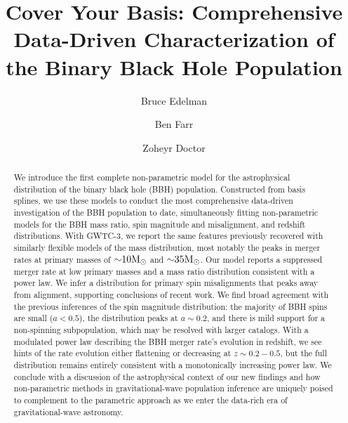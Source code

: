 \documentclass[twocolumn]{aastex631}
\newcommand{\msun}{\ensuremath{{\rm M}_\odot}}
\begin{document}
\title{Cover Your Basis: Comprehensive Data-Driven Characterization of the Binary Black Hole Population}

\author{Bruce Edelman}
\author{Ben Farr}
\author{Zoheyr Doctor}


\begin{abstract}                 
We introduce the first complete non-parametric model for the astrophysical distribution of the binary black hole (BBH) population. Constructed from basis splines, we use these models to conduct the most comprehensive data-driven investigation of the BBH population to date, simultaneously fitting non-parametric models for the BBH mass ratio, spin magnitude and misalignment, and redshift distributions. With GWTC-3, we report the same features previously recovered with similarly flexible models of the mass distribution, most notably the peaks in merger rates at primary masses of ${\sim}10\msun$ and ${\sim}35\msun$. Our model reports a suppressed merger rate at low primary masses and a mass ratio distribution consistent with a power law. We infer a distribution for primary spin misalignments that peaks away from alignment, supporting conclusions of recent work. We find broad agreement with the previous inferences of the spin magnitude distribution: the majority of BBH spins are small ($a<0.5$), the distribution peaks at $a\sim0.2$, and there is mild support for a non-spinning subpopulation, which may be resolved with larger catalogs. With a modulated power law describing the BBH merger rate's evolution in redshift, we see hints of the rate evolution either flattening or decreasing at $z\sim0.2-0.5$, but the full distribution remains entirely consistent with a monotonically increasing power law. We conclude with a discussion of the astrophysical context of our new findings and how non-parametric methods in gravitational-wave population inference are uniquely poised to complement to the parametric approach as we enter the data-rich era of gravitational-wave astronomy.
\end{abstract}


\end{document}
